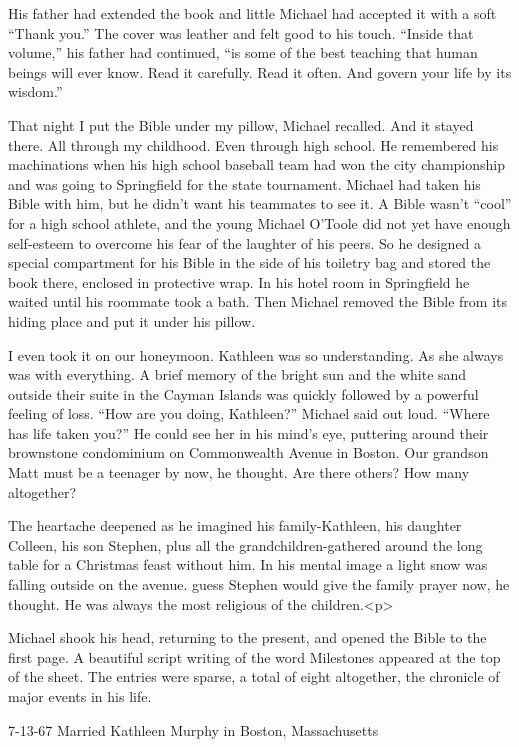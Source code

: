 \documentclass[]{article}
\begin{document}
{His father had extended the book and little Michael had accepted it with a soft “Thank you.” The cover was leather and felt good to his touch. “Inside that volume,” his father had continued, “is some of the best teaching that human beings will ever know. Read it carefully. Read it often. And govern your life by its wisdom.”

That night I put the Bible under my pillow, Michael recalled. And it stayed there. All through my childhood. Even through high school. He remembered his machinations when his high school baseball team had won the city championship and was going to Springfield for the state tournament. Michael had taken his Bible with him, but he didn’t want his teammates to see it. A Bible wasn’t “cool” for a high school athlete, and the young Michael O’Toole did not yet have enough self-esteem to overcome his fear of the laughter of his peers. So he designed a special compartment for his Bible in the side of his toiletry bag and stored the book there, enclosed in protective wrap. In his hotel room in Springfield he waited until his roommate took a bath. Then Michael removed the Bible from its hiding place and put it under his pillow.

I even took it on our honeymoon. Kathleen was so understanding. As she always was with everything. A brief memory of the bright sun and the white sand outside their suite in the Cayman Islands was quickly followed by a powerful feeling of loss. “How are you doing, Kathleen?” Michael said out loud. “Where has life taken you?” He could see her in his mind’s eye, puttering around their brownstone condominium on Commonwealth Avenue in Boston. Our grandson Matt must be a teenager by now, he thought. Are there others? How many altogether?

The heartache deepened as he imagined his family-Kathleen, his daughter Colleen, his son Stephen, plus all the grandchildren-gathered around the long table for a Christmas feast without him. In his mental image a light snow was falling outside on the avenue. guess Stephen would give the family prayer now, he thought. He was always the most religious of the children.<p>

Michael shook his head, returning to the present, and opened the Bible to the first page. A beautiful script writing of the word Milestones appeared at the top of the sheet. The entries were sparse, a total of eight altogether, the chronicle of major events in his life.

7-13-67 Married Kathleen Murphy in Boston, Massachusetts

}
\end{document}
